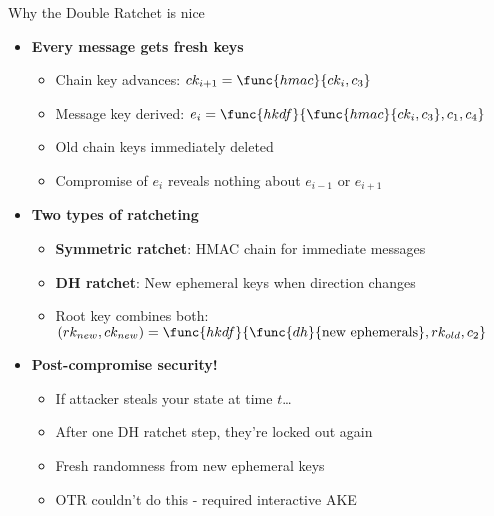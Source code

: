 \documentclass[aspectratio=169, lualatex, handout]{beamer}
\begin{document}
\begin{frame}{Why the Double Ratchet is nice}
	\begin{itemize}
		\item \textbf{Every message gets fresh keys}
		      \begin{itemize}
			      \item Chain key advances: $ck_{i+1} = \func{hmac}{ck_i, c_3}$
			      \item Message key derived: $e_i = \func{hkdf}{\func{hmac}{ck_i, c_3}, c_1, c_4}$
			      \item Old chain keys immediately deleted
			      \item Compromise of $e_i$ reveals nothing about $e_{i-1}$ or $e_{i+1}$
		      \end{itemize}
		\item \textbf{Two types of ratcheting}
		      \begin{itemize}
			      \item \textbf{Symmetric ratchet}: HMAC chain for immediate messages
			      \item \textbf{DH ratchet}: New ephemeral keys when direction changes
			      \item Root key combines both: $(rk_{new}, ck_{new}) = \func{hkdf}{\func{dh}{\text{new ephemerals}}, rk_{old}, c_2}$
		      \end{itemize}
		\item \textbf{Post-compromise security!}
		      \begin{itemize}
			      \item If attacker steals your state at time $t$\ldots
			      \item After one DH ratchet step, they're locked out again
			      \item Fresh randomness from new ephemeral keys
			      \item OTR couldn't do this - required interactive AKE
		      \end{itemize}
	\end{itemize}
\end{frame}
\end{document}
